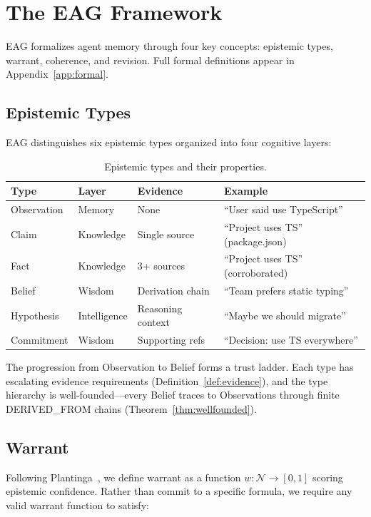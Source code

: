 \documentclass[11pt,letterpaper]{article}
\begin{document}
\section{The EAG Framework}
\label{sec:eag}

EAG formalizes agent memory through four key concepts: epistemic types, warrant, coherence, and revision. Full formal definitions appear in Appendix~\ref{app:formal}.

\subsection{Epistemic Types}

EAG distinguishes six epistemic types organized into four cognitive layers:

\begin{table}[H]
\centering
\caption{Epistemic types and their properties.}
\label{tab:types}
\begin{tabular}{@{}lllp{4cm}@{}}
\toprule
\textbf{Type} & \textbf{Layer} & \textbf{Evidence} & \textbf{Example} \\
\midrule
Observation & Memory & None & ``User said use TypeScript'' \\
Claim & Knowledge & Single source & ``Project uses TS'' (package.json) \\
Fact & Knowledge & 3+ sources & ``Project uses TS'' (corroborated) \\
Belief & Wisdom & Derivation chain & ``Team prefers static typing'' \\
Hypothesis & Intelligence & Reasoning context & ``Maybe we should migrate'' \\
Commitment & Wisdom & Supporting refs & ``Decision: use TS everywhere'' \\
\bottomrule
\end{tabular}
\end{table}

The progression from Observation to Belief forms a trust ladder. Each type has escalating evidence requirements (Definition~\ref{def:evidence}), and the type hierarchy is well-founded---every Belief traces to Observations through finite DERIVED\_FROM chains (Theorem~\ref{thm:wellfounded}).

\subsection{Warrant}

Following Plantinga~\cite{plantinga1993}, we define warrant as a function $w: \mathcal{N} \to [0,1]$ scoring epistemic confidence. Rather than commit to a specific formula, we require any valid warrant function to satisfy:
\end{document}
